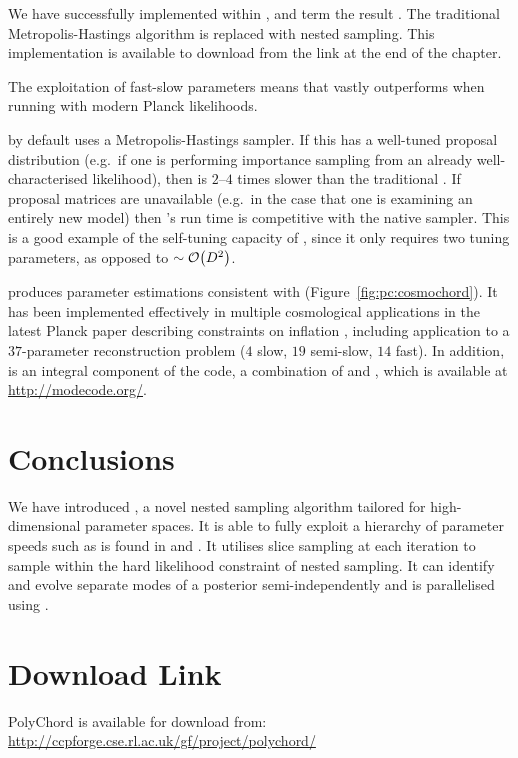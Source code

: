 We have successfully implemented \PolyChord{} within \CosmoMC{}, and term the result \CosmoChord{}.  The traditional Metropolis-Hastings algorithm is replaced with nested sampling. This implementation is available to download from the link at the end of the chapter.

The exploitation of fast-slow parameters means that \CosmoChord{} vastly outperforms \MultiNest{} when running with modern Planck likelihoods. 

\CosmoMC{} by default uses a Metropolis-Hastings sampler. If this has a well-tuned proposal distribution (e.g.\ if one is performing importance sampling from an already well-characterised likelihood), then \PolyChord{} is \(2\)--\(4\) times slower than the traditional \CosmoMC{}. If proposal matrices are unavailable (e.g.\ in the case that one is examining an entirely new model) then \CosmoChord{}'s run time is competitive with the native \CosmoMC{} sampler. This is a good example of the self-tuning capacity of \PolyChord{}, since it only requires two tuning parameters, as opposed to \({\sim\mathcal{O}{\left(D^2\right)}}\).

\CosmoChord{} produces parameter estimations consistent with \CosmoMC{} (Figure~\ref{fig:pc:cosmochord}).
It has been implemented effectively in multiple cosmological applications in the latest Planck paper describing constraints on inflation \citep{planck2015-a24}, including application to a \(37\)-parameter reconstruction problem (\(4\) slow, \(19\) semi-slow, \(14\) fast). 
In addition, \PolyChord{} is an integral component of the \ModeChord{} code, a combination of \CosmoChord{} and \ModeCode{} \citep{ModeChord1,ModeChord2,ModeChord3}, which is available at \url{http://modecode.org/}.

\section{Conclusions}
\label{sec:pc:conclusions}
We have introduced \PolyChord{}, a novel nested sampling algorithm tailored for high-dimensional parameter spaces. It is able to fully exploit a hierarchy of parameter speeds such as is found in \CosmoMC{} and \CAMB{}. It utilises slice sampling at each iteration to sample within the hard likelihood constraint of nested sampling. It can identify and evolve separate modes of a posterior semi-independently and is parallelised using \openMPI{}.












\section*{Download Link}
PolyChord is available for download from:\\ \url{http://ccpforge.cse.rl.ac.uk/gf/project/polychord/}


